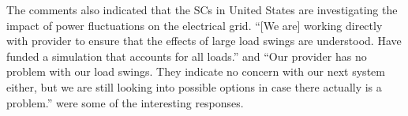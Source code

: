 The comments also indicated that the SCs in United States are investigating the impact of power fluctuations on the electrical grid. ``[We are] working directly with provider to ensure that the effects of large load swings are understood. Have funded a simulation that accounts for all loads.'' and ``Our provider has no problem with our load swings. They indicate no concern with our next system either, but we are still looking into possible options in case there actually is a problem.'' were some of the interesting responses.
